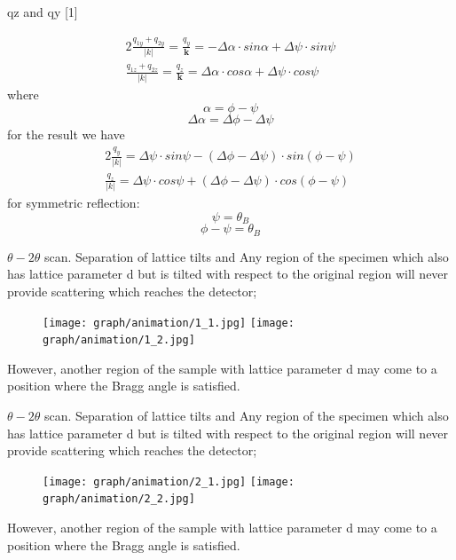 \documentclass{beamer}
\begin{document}
\begin{frame}{qz and qy  [1]}

\begin{alignat}{2}
\frac{q_{1y}+q_{2y}}{|k|} =\frac{q_y}{\pmb  k} =-\Delta \alpha \cdot sin\alpha + \Delta \psi \cdot sin \psi \\
\frac{q_{1z}+q_{2z}}{|k|} =\frac{q_z}{\pmb  k} = \Delta \alpha \cdot cos\alpha +   \Delta \psi \cdot cos \psi 
\end{alignat}
where
 $$\alpha = \phi - \psi$$
$$\Delta \alpha = \Delta\phi - \Delta\psi$$
for the result we have
\begin{alignat}{2}
\frac{q_y}{| k|} =\Delta \psi \cdot sin \psi - (\Delta \phi - \Delta \psi) \cdot sin(\phi - \psi) \\
\frac{q_z}{|k|} =\Delta \psi \cdot cos \psi + (\Delta \phi - \Delta \psi) \cdot cos(\phi - \psi)   
\end{alignat}
for symmetric reflection:
$$\psi = \theta_B$$
$$\phi - \psi= \theta_B$$

\end{frame}

\begin{frame}{$\theta-2\theta$ scan. Separation of lattice tilts and }
Any region of the specimen which also has lattice
parameter \fbox d but is tilted with respect to the original region will never provide
scattering which reaches the detector;
\begin{figure}[h] 
\centering
\texttt{[image: graph/animation/1\_1.jpg]} 
\texttt{[image: graph/animation/1\_2.jpg]} 
\end{figure}
However, another region of the sample with lattice parameter \fbox d may come to a position where the Bragg angle is satisfied.
\end{frame}

\begin{frame}{$\theta-2\theta$ scan. Separation of lattice tilts and }
Any region of the specimen which also has lattice
parameter \fbox d but is tilted with respect to the original region will never provide
scattering which reaches the detector;
\begin{figure}[h] 
\centering
\texttt{[image: graph/animation/2\_1.jpg]} 
\texttt{[image: graph/animation/2\_2.jpg]} 
\end{figure}
However, another region of the sample with lattice parameter \fbox d may come to a position where the Bragg angle is satisfied.
\end{frame}
\end{document}
